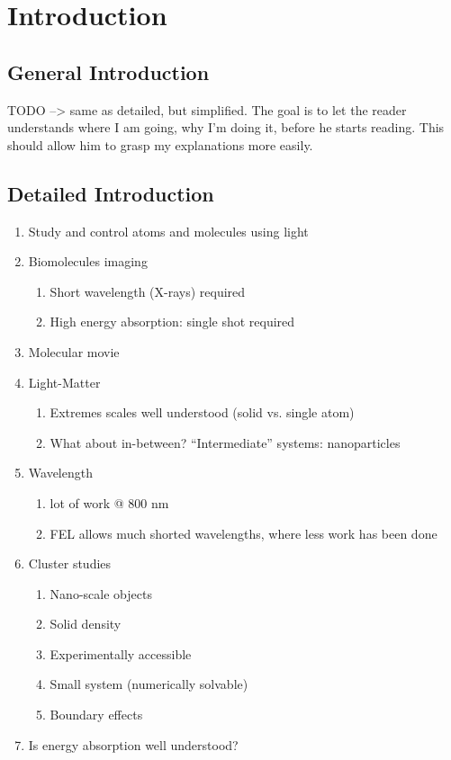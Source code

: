 \section{Introduction}





\subsection{General Introduction}
TODO --> same as detailed, but simplified.
The goal is to let the reader understands where I am going, why I'm doing
it, before he starts reading. This should allow him to grasp my explanations
more easily.


\subsection{Detailed Introduction}

\begin{enumerate}
\item Study and control atoms and molecules using light
\item Biomolecules imaging
    \begin{enumerate}
        \item Short wavelength (X-rays) required
        \item High energy absorption: single shot required
    \end{enumerate}
\item Molecular movie
\item Light-Matter
    \begin{enumerate}
        \item Extremes scales well understood (solid vs. single atom)
        \item What about in-between? ``Intermediate'' systems: nanoparticles
    \end{enumerate}
\item Wavelength
    \begin{enumerate}
        \item lot of work @ 800 nm
        \item FEL allows much shorted wavelengths, where less work has been done
    \end{enumerate}
\item Cluster studies
    \begin{enumerate}
        \item Nano-scale objects
        \item Solid density
        \item Experimentally accessible
        \item Small system (numerically solvable)
        \item Boundary effects
    \end{enumerate}
\item Is energy absorption well understood?
\end{enumerate}






